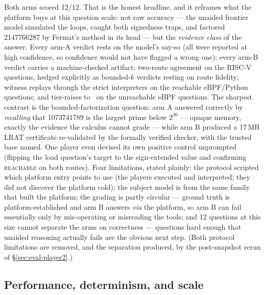 Both arms scored 12/12. That is the honest headline, and it reframes
what the platform buys at this question scale: not raw accuracy ---
the unaided frontier model simulated the loops, caught both signedness
traps, and factored 2147766287 by Fermat's method in its head --- but
the \emph{evidence class} of the answer. Every arm-A verdict rests on
the model's say-so (all were reported at high confidence, so
confidence would not have flagged a wrong one); every arm-B verdict
carries a machine-checked artifact: two-route agreement on the RISC-V
questions, hedged explicitly as bounded-$k$ verdicts resting on route
fidelity; witness replays through the strict interpreters on the
reachable eBPF/Python questions; and tier-raises to \tprov\ on the
unreachable eBPF questions. The sharpest contrast is the
bounded-factorization question: arm A answered correctly by
\emph{recalling} that 1073741789 is the largest prime below $2^{30}$
--- opaque memory, exactly the evidence the calculus cannot grade ---
while arm B produced a 17\,MB LRAT certificate re-validated by the
formally verified checker, with the trusted base named. One player
even devised its own positive control unprompted (flipping the load
question's target to the sign-extended value and confirming
\textsc{reachable} on both routes). Four limitations, stated plainly:
the protocol scripted which platform entry points to use (the players
executed and interpreted; they did not discover the platform cold);
the subject model is from the same family that built the platform;
the grading is partly circular --- ground truth is
platform-established and arm B answers \emph{via} the platform, so arm
B can fail essentially only by mis-operating or misreading the tools;
and
12 questions at this size cannot separate the arms on correctness ---
questions hard enough that unaided reasoning actually fails are the
obvious next step.\ifarxiv{} (Both protocol limitations are removed,
and the separation produced, by the post-snapshot rerun of
\S\ref{sec:eval-player2}.)\fi

\subsection{Performance, determinism, and scale}
\label{sec:eval-perf}



{\setlength{\tabcolsep}{4pt}%
}

